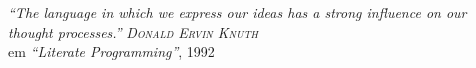 \begin{epigrafe}
\hypertarget{estilo:epigrafe}{}
\textit{\large``The language in which we express our ideas has a strong influence on our thought processes.''}
\vspace{1cm}
\hspace{4cm} \emph{\textsc{Donald Ervin Knuth}}\\\hspace{4cm} em \textsl{``Literate Programming''}, 1992
\end{epigrafe}
